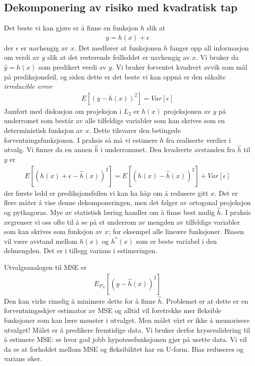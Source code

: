 \subsection{Dekomponering av risiko med kvadratisk tap}
Det beste vi kan gjøre er å finne en funksjon $h$ slik at
\begin{align}
y = h(x)+\epsilon
\end{align}
der $\epsilon$ er uavhengig av $x$. Det medfører at funksjonen $h$ fanger opp all informasjon om verdi av $y$ slik at det resterende feilleddet er uavhengig av $x$. Vi bruker da $\hat{y}=h(x)$ som predikert verdi av $y$. Vi bruker forventet kvadrert avvik som mål på prediksjonsfeil, og siden dette er det beste vi kan oppnå er den såkalte \textit{irreducible error}
\begin{align}
E[(y-h(x))^2] = Var[\epsilon]
\end{align}
Jamført med diskusjon om projeksjon i $L_2$ er $h(x)$ projeksjonen av $y$ på underromet som består av alle tilfeldige variabler som kan skrives som en deterministisk funksjon av $x$. Dette tilsvarer den betingede forventningsfunksjonen. I praksis så må vi estimere $h$ fra realiserte verdier i utvalg. Vi finner da en annen $\hat{h}$ i underrommet. Den kvadrerte avstanden fra $\hat{h}$ til $y$ er
\begin{align}
E[(h(x)+\epsilon-\hat{h}(x))^2] = E[(h(x)-\hat{h}(x))^2] + Var[\epsilon]
\end{align}
der første ledd er prediksjonsfeilen vi kan ha håp om å redusere gitt $x$. Det er flere måter å vise denne dekomponeringen, men det følger av ortogonal projeksjon og pythagoras. Mye av statistisk læring handler om å finne best mulig $\hat{h}$. I praksis avgrenser vi oss ofte til å se på et underrom av mengden av tilfeldige variabler som kan skrives som funksjon av $x$; for eksempel alle lineære funksjoner. Biasen vil være avstand mellom $h(x)$ og $h^*(x)$ som er beste variabel i den delmengden. Det er i tillegg varians i estimeringen. 

Utvalgsanalogen til MSE er
\begin{align}
E_{P_N}[(y-\hat{h}(x))^2]
\end{align}
Den kan virke rimelig å minimere dette for å finne $\hat{h}$. Problemet er at dette er en forventningsskjev estimator av MSE og alltid vil foretrekke mer fleksible funksjoner som kan lære mønster i utvalget. Men målet vårt er ikke å memorisere utvalget! Målet er å predikere fremtidige data. Vi bruker derfor kryssvalidering til å estimere MSE: se hvor god jobb hypotesefunksjonen gjør på usette data. Vi vil da se at forholdet mellom MSE og fleksibilitet har en U-form. Bias reduseres og varians øker. 
